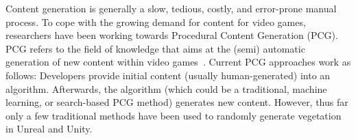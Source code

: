 


Content generation is generally a slow, tedious, costly, and error-prone manual process. To cope with the growing demand for content for video games, researchers have been working towards Procedural Content Generation (PCG). PCG refers to the field of knowledge that aims at the (semi) automatic generation of new content within video games~\cite{hendrikx2013procedural}. Current PCG approaches work as follows: Developers provide initial content (usually human-generated) into an algorithm. Afterwards, the algorithm (which could be a traditional, machine learning, or search-based PCG method) generates new content. However, thus far only a few traditional methods have been used to randomly generate vegetation~\cite{speedtreeweb} in Unreal and Unity.

